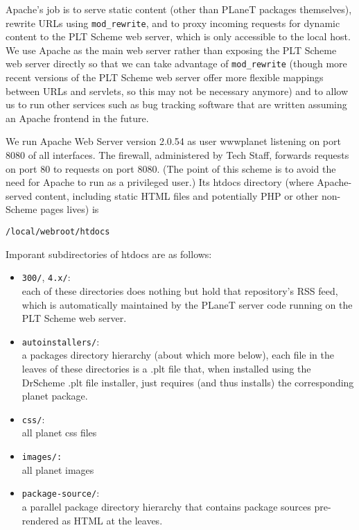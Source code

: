 \documentclass{article}
\begin{document}
Apache's job is to serve static content (other than PLaneT packages
themselves), rewrite URLs using \texttt{mod\_rewrite}, and to proxy incoming
requests for dynamic content to the PLT Scheme web server, which is
only accessible to the local host. We use Apache as the main web
server rather than exposing the PLT Scheme web server directly so that
we can take advantage of \texttt{mod\_rewrite} (though more recent versions of
the PLT Scheme web server offer more flexible mappings between URLs
and servlets, so this may not be necessary anymore) and to allow us to
run other services such as bug tracking software that are written
assuming an Apache frontend in the future.

We run Apache Web Server version 2.0.54 as user wwwplanet listening
on port 8080 of all interfaces. The firewall, administered by Tech
Staff, forwards requests on port 80 to requests on port 8080. (The
point of this scheme is to avoid the need for Apache to run as a
privileged user.)  Its htdocs directory (where Apache-served content,
including static HTML files and potentially PHP or other non-Scheme
pages lives) is

  \texttt{/local/webroot/htdocs}

Imporant subdirectories of htdocs are as follows:

\begin{itemize}
\item \texttt{300/}, \texttt{4.x/}:  \\
each of these directories does nothing but hold that repository's RSS
  feed, which is automatically maintained by the PLaneT server code
  running on the PLT Scheme web server.

\item \texttt{autoinstallers/}: \\
a packages directory hierarchy (about which more below), each file in
  the leaves of these directories is a .plt file that, when installed
  using the DrScheme .plt file installer, just requires (and thus
  installs) the corresponding planet package.
\item \texttt{css/}: \\
all planet css files
\item \texttt{images/:} \\
all planet images
\item \texttt{package-source/}: \\
a parallel package directory hierarchy that contains package sources
pre-rendered as HTML at the leaves.
\end{itemize}
\end{document}
